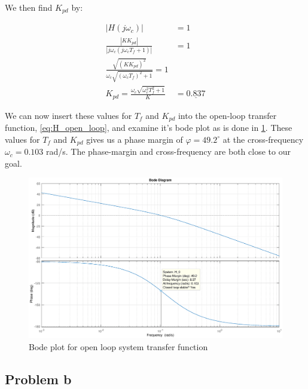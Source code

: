 We then find $K_{pd}$ by:

\begin{subequations} \label{eq:K_pd}
    \begin{align}
       |H(j \omega_c)| &= 1 \\
       \frac{|K K_{pd}|}{|j \omega_c (j \omega_c T_f + 1)|} &= 1 \\
       \frac{\sqrt{(K K_{pd})^2}}{\omega_c \sqrt{ (\omega_c T_f)^2 + 1}} = 1 \\
       K_{pd} = \frac{ \omega_c \sqrt{\omega_c^2 T_f^2 + 1}}{K} &= \underline{0.837}
    \end{align}
\end{subequations}

We can now insert these values for $T_f$ and $K_{pd}$ into the open-loop transfer function, \cref{eq:H_open_loop}, and examine it's bode plot as is done in \cref{fig:p5p3_bode_plot}. These values for $T_f$ and $K_{pd}$ gives us a phase margin of $\varphi = 49.2^\circ$ at the cross-frequency $\omega_c = 0.103$ rad/s. The phase-margin and cross-frequency are both close to our goal.

\begin{figure}[h]
	\centering
	\includegraphics[width=\textwidth]{figures/bode_plot.eps}
	\caption{Bode plot for open loop system transfer function}
\label{fig:p5p3_bode_plot}
\end{figure}


\subsection{Problem b} \label{sec:Autopilot_b}

